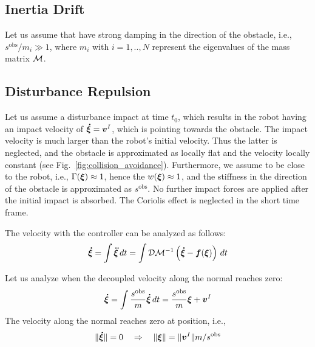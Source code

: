 \documentclass[conference]{IEEEtran}
\begin{document}
\subsection{Inertia Drift}
Let us assume that have strong damping in the direction of the obstacle, i.e., $s^{\mathrm{obs}} / m_i \gg 1$, where $m_i$ with $i = 1, .., N$ represent the eigenvalues of the mass matrix $\mathcal{M}$. 


\subsection{Disturbance Repulsion}
Let us assume a disturbance impact at time $t_0$, which results in the robot having an impact velocity of $\boldsymbol{\dot \xi} = \boldsymbol{v}^I$, which is pointing towards the obstacle. The impact velocity is much larger than the robot's initial velocity. Thus the latter is neglected, and the obstacle is approximated as locally flat and the velocity locally constant (see Fig.~\ref{fig:collision_avoidance}). Furthermore, we assume to be close to the robot, i.e., $\Gamma(\boldsymbol{\xi}) \approx 1$, hence the $w(\boldsymbol{\xi}) \approx 1$, and the stiffness in the direction of the obstacle is approximated as $s^{\mathrm{obs}}$.
No further impact forces are applied after the initial impact is absorbed. The Coriolis effect is neglected in the short time frame.

The velocity with the controller can be analyzed as follows:
\begin{equation}
    \boldsymbol{\dot \xi} = \int \boldsymbol{\ddot \xi} \, dt = \int \mathcal{D} \mathcal{M}^{-1} \left( \boldsymbol{\dot \xi} - \boldsymbol{f}(\boldsymbol{\xi}) \right) \, dt
\end{equation}

Let us analyze when the decoupled velocity along the normal reaches zero:
\begin{equation}
    \vecs{\dot \xi} = \int \frac{s^{\mathrm{obs}}}{m} \vecs{\dot \xi} \, dt = \frac{s^{\mathrm{obs}}}{m} \vecs{\xi} + \vecs v^I \label{eq:velocity_with_control}
\end{equation}
The velocity along the normal reaches zero at position, i.e., 
\begin{equation}
    \| \boldsymbol{\dot \xi} \| = 0
    \quad \Rightarrow \quad
    \|\boldsymbol{\xi} \| = \| \boldsymbol{v}^I \| {m} / {s^{\mathrm{obs}}} 
\end{equation}

\begin{lemma}

\end{lemma}
\end{document}

